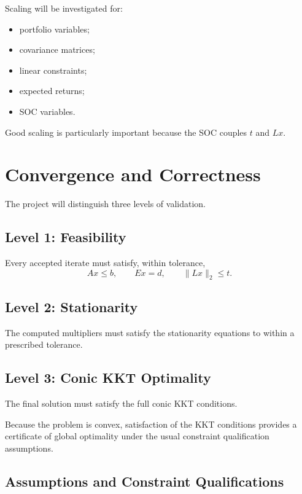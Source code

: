 \documentclass[11pt,a4paper]{article}
\begin{document}
Scaling will be investigated for:

\begin{itemize}
    \item portfolio variables;
    \item covariance matrices;
    \item linear constraints;
    \item expected returns;
    \item SOC variables.
\end{itemize}

Good scaling is particularly important because the SOC couples $t$
and $Lx$.

\section{Convergence and Correctness}

The project will distinguish three levels of validation.

\subsection{Level 1: Feasibility}

Every accepted iterate must satisfy, within tolerance,
\[
Ax\leq b,
\qquad
Ex=d,
\qquad
\|Lx\|_2\leq t.
\]

\subsection{Level 2: Stationarity}

The computed multipliers must satisfy the stationarity equations to
within a prescribed tolerance.

\subsection{Level 3: Conic KKT Optimality}

The final solution must satisfy the full conic KKT conditions.

Because the problem is convex, satisfaction of the KKT conditions
provides a certificate of global optimality under the usual
constraint qualification assumptions.

\subsection{Assumptions and Constraint Qualifications}
\end{document}
